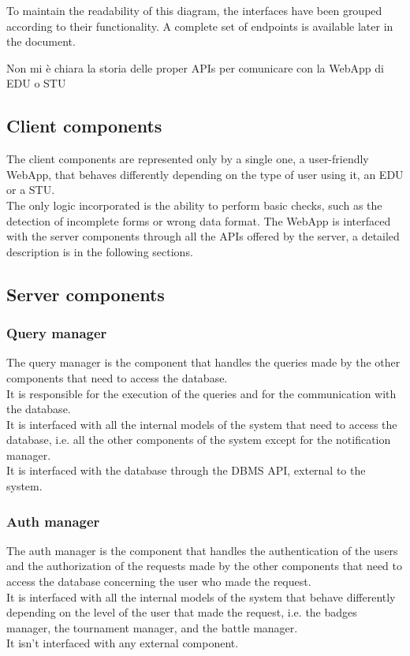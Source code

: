 To maintain the readability of this diagram, the interfaces have been grouped according to their functionality.
A complete set of endpoints is available later in the document.

{\color{red} Non mi è chiara la storia delle proper APIs per comunicare con la WebApp di EDU o STU }

\subsection{Client components}
The client components are represented only by a single one, a user-friendly WebApp, that behaves differently depending on the type of user using it, an EDU or a STU. \\
The only logic incorporated is the ability to perform basic checks, such as the detection of incomplete forms or wrong data format. 
The WebApp is interfaced with the server components through all the APIs offered by the server, a detailed description is in the following sections.
\subsection{Server components}

\subsubsection*{Query manager}
The query manager is the component that handles the queries made by the other components that need to access the database. \\
It is responsible for the execution of the queries and for the communication with the database. \\
It is interfaced with all the internal models of the system that need to access the database, i.e. all the other components of the system except for the notification manager. \\
It is interfaced with the database through the DBMS API, external to the system.

\subsubsection*{Auth manager}
The auth manager is the component that handles the authentication of the users and the authorization of the requests made by the other components that need to access the database concerning the user who made the request.\\
It is interfaced with all the internal models of the system that behave differently depending on the level of the user that made the request, i.e. the badges manager, the tournament manager, and the battle manager.\\
It isn't interfaced with any external component.

